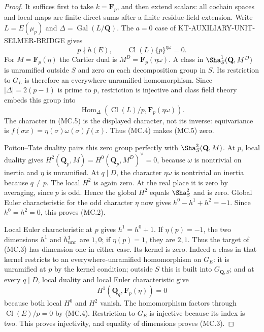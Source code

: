 \begin{proof}
It suffices first to take $k=\mathbf F_p$, and then extend
scalars: all cochain spaces and local maps are finite direct
sums after a finite residue-field extension.
Write $L=E(\mu_p)$ and $\Delta=\operatorname{Gal}(L/\mathbf Q)$.
The $a=0$ case of KT-AUXILIARY-UNIT-SELMER-BRIDGE gives
\[
              p\nmid h(E),\qquad
              \operatorname{Cl}(L)\{p\}^{\eta\omega}=0.
                                                               \tag{MC.4}
\]
For $M=\mathbf F_p(\eta)$ the Cartier dual is
$M^D=\mathbf F_p(\eta\omega)$.
A class in $\Sha^1_S(\mathbf Q,M^D)$ is unramified outside
$S$ and zero on each decomposition group in $S$.
Its restriction to $G_L$ is therefore an everywhere-unramified
homomorphism.  Since $|\Delta|=2(p-1)$ is prime to $p$,
restriction is injective and class field theory embeds this
group into
\[
   \operatorname{Hom}_\Delta
       (\operatorname{Cl}(L)/p,\mathbf F_p(\eta\omega)).  \tag{MC.5}
\]
The character in (MC.5) is the displayed character, not its
inverse: equivariance is $f(\sigma x)=\eta(\sigma)
\omega(\sigma)f(x)$.  Thus (MC.4) makes (MC.5) zero.

Poitou--Tate duality pairs this zero group perfectly with
$\Sha^2_S(\mathbf Q,M)$.  At $p$, local duality gives
$H^2(\mathbf Q_p,M)=H^0(\mathbf Q_p,M^D)^\vee=0$,
because $\omega$ is nontrivial on inertia and $\eta$ is
unramified.  At $q\mid D$, the character $\eta\omega$
is nontrivial on inertia because $q\ne p$.  The local
$H^2$ is again zero.  At the real place it is zero by
averaging, since $p$ is odd.  Hence the global $H^2$ equals
$\Sha^2_S$ and is zero.  Global Euler characteristic for
the odd character $\eta$ now gives
$h^0-h^1+h^2=-1$.  Since $h^0=h^2=0$, this proves (MC.2).

Local Euler characteristic at $p$ gives $h^1=h^0+1$.
If $\eta(p)=-1$, the two dimensions $h^1$ and
$h^1_{\rm unr}$ are $1,0$; if $\eta(p)=1$, they are $2,1$.
Thus the target of (MC.3) has dimension one in either case.
Its kernel is zero.  Indeed a class in that kernel restricts
to an everywhere-unramified homomorphism on $G_E$: it is
unramified at $p$ by the kernel condition; outside $S$ this
is built into $G_{\mathbf Q,S}$; and at every $q\mid D$,
local duality and local Euler characteristic give
\[
               H^1(\mathbf Q_q,\mathbf F_p(\eta))=0
                                                               \tag{MC.6}
\]
because both local $H^0$ and $H^2$ vanish.
The homomorphism factors through $\operatorname{Cl}(E)/p=0$
by (MC.4).  Restriction to $G_E$ is injective because its
index is two.  This proves injectivity, and equality of
dimensions proves (MC.3).
\end{proof}

